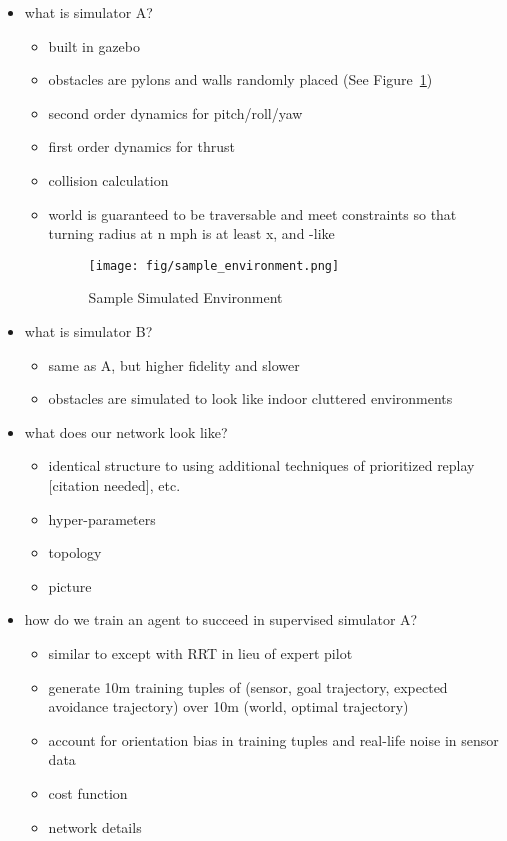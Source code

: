 \documentclass[paper=a4, fontsize=11pt]{scrartcl} %
\begin{document}
\begin{itemize}
	\item what is simulator A?
	\begin{itemize}
		\item built in gazebo
		\item obstacles are pylons and walls randomly placed (See Figure~\ref{fig:sample_environment})
		\item second order dynamics for pitch/roll/yaw
		\item first order dynamics for thrust
		\item collision calculation
		\item world is guaranteed to be traversable and meet constraints so that turning radius at n mph is at least x, and \cite{Richter2014}-like 

		\begin{figure}
		  \centering
		  \texttt{[image: fig/sample\_environment.png]}
		  \caption{Sample Simulated Environment}
		  \label{fig:sample_environment}
		\end{figure}
	\end{itemize}

	\item what is simulator B?
	\begin{itemize}
		\item same as A, but higher fidelity and slower
		\item obstacles are simulated to look like indoor cluttered environments
	\end{itemize}

	\item what does our network look like?
	\begin{itemize}
		\item identical structure to \cite{Lillicrap2015} using additional techniques of prioritized replay [citation needed], etc.
		\item hyper-parameters
		\item topology
		\item picture
	\end{itemize}

	\item how do we train an agent to succeed in supervised simulator A?
	\begin{itemize}
		\item similar to \cite{Kim2015} except with RRT in lieu of expert pilot 
		\item generate 10m training tuples of (sensor, goal trajectory, expected avoidance trajectory) over 10m (world, optimal trajectory)
		\item account for orientation bias in training tuples and real-life noise in sensor data
		\item cost function
		\item network details
	\end{itemize}


\end{itemize}
\end{document}
